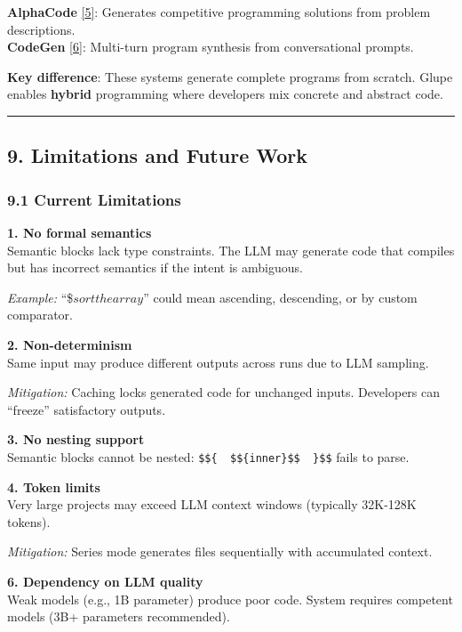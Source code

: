 \documentclass[11pt, a4paper]{article}
\begin{document}
\textbf{AlphaCode} \hyperref[references]{{[}5{]}}: Generates competitive
programming solutions from problem descriptions.\\
\textbf{CodeGen} \hyperref[references]{{[}6{]}}: Multi-turn program
synthesis from conversational prompts.

\textbf{Key difference}: These systems generate complete programs from
scratch. Glupe enables \textbf{hybrid} programming where developers mix
concrete and abstract code.

\begin{center}\rule{0.5\linewidth}{0.5pt}\end{center}

\subsection{9. Limitations and Future
Work}\label{limitations-and-future-work}

\subsubsection{9.1 Current Limitations}\label{current-limitations}

\textbf{1. No formal semantics}\\
Semantic blocks lack type constraints. The LLM may generate code that
compiles but has incorrect semantics if the intent is ambiguous.

\emph{Example:} ``\$\({sort the array}\)'' could mean ascending,
descending, or by custom comparator.

\textbf{2. Non-determinism}\\
Same input may produce different outputs across runs due to LLM
sampling.

\emph{Mitigation:} Caching locks generated code for unchanged inputs.
Developers can ``freeze'' satisfactory outputs.

\textbf{3. No nesting support}\\
Semantic blocks cannot be nested:
\texttt{\$\$\{\ \ \$\$\{inner\}\$\$\ \ \}\$\$} fails to parse.

\textbf{4. Token limits}\\
Very large projects may exceed LLM context windows (typically 32K-128K
tokens).

\emph{Mitigation:} Series mode generates files sequentially with
accumulated context.

\textbf{6. Dependency on LLM quality}\\
Weak models (e.g., 1B parameter) produce poor code. System requires
competent models (3B+ parameters recommended).
\end{document}
